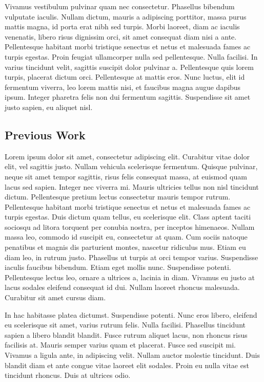 Vivamus vestibulum pulvinar quam nec consectetur. Phasellus bibendum vulputate iaculis. Nullam dictum, mauris a adipiscing porttitor, massa purus mattis magna, id porta erat nibh sed turpis. Morbi laoreet, diam ac iaculis venenatis, libero risus dignissim orci, sit amet consequat diam nisi a ante. Pellentesque habitant morbi tristique senectus et netus et malesuada fames ac turpis egestas. Proin feugiat ullamcorper nulla sed pellentesque. Nulla facilisi. In varius tincidunt velit, sagittis suscipit dolor pulvinar a. Pellentesque quis lorem turpis, placerat dictum orci. Pellentesque at mattis eros. Nunc luctus, elit id fermentum viverra, leo lorem mattis nisi, et faucibus magna augue dapibus ipsum. Integer pharetra felis non dui fermentum sagittis. Suspendisse sit amet justo sapien, eu aliquet nisl.

\subsection{Previous Work}
Lorem ipsum dolor sit amet, consectetur adipiscing elit. Curabitur vitae dolor elit, vel sagittis justo. Nullam vehicula scelerisque fermentum. Quisque pulvinar, neque sit amet tempor sagittis, risus felis consequat massa, at euismod quam lacus sed sapien. Integer nec viverra mi. Mauris ultricies tellus non nisl tincidunt dictum. Pellentesque pretium lectus consectetur mauris tempor rutrum. Pellentesque habitant morbi tristique senectus et netus et malesuada fames ac turpis egestas. Duis dictum quam tellus, eu scelerisque elit. Class aptent taciti sociosqu ad litora torquent per conubia nostra, per inceptos himenaeos. Nullam massa leo, commodo id suscipit eu, consectetur at quam. Cum sociis natoque penatibus et magnis dis parturient montes, nascetur ridiculus mus. Etiam eu diam leo, in rutrum justo. Phasellus ut turpis at orci tempor varius. Suspendisse iaculis faucibus bibendum. Etiam eget mollis nunc. Suspendisse potenti. Pellentesque lectus leo, ornare a ultrices a, lacinia in diam. Vivamus eu justo at lacus sodales eleifend consequat id dui. Nullam laoreet rhoncus malesuada. Curabitur sit amet cursus diam.

In hac habitasse platea dictumst. Suspendisse potenti. Nunc eros libero, eleifend eu scelerisque sit amet, varius rutrum felis. Nulla facilisi. Phasellus tincidunt sapien a libero blandit blandit. Fusce rutrum aliquet lacus, non rhoncus risus facilisis at. Mauris semper varius quam et placerat. Fusce sed suscipit mi. Vivamus a ligula ante, in adipiscing velit. Nullam auctor molestie tincidunt. Duis blandit diam et ante congue vitae laoreet elit sodales. Proin eu nulla vitae est tincidunt rhoncus. Duis at ultrices odio.